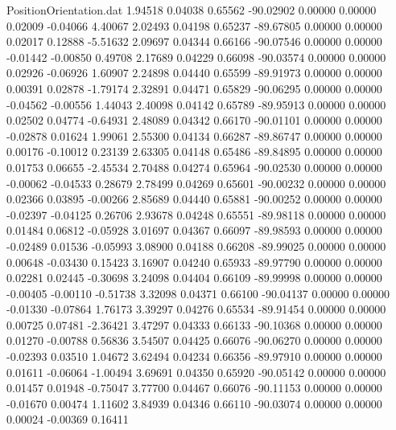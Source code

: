 \begin{filecontents}{PositionOrientation.dat}
   1.94518    0.04038    0.65562   -90.02902    0.00000    0.00000    0.02009   -0.04066    4.40067
   2.02493    0.04198    0.65237   -89.67805    0.00000    0.00000    0.02017    0.12888   -5.51632
   2.09697    0.04344    0.66166   -90.07546    0.00000    0.00000   -0.01442   -0.00850    0.49708
   2.17689    0.04229    0.66098   -90.03574    0.00000    0.00000    0.02926   -0.06926    1.60907
   2.24898    0.04440    0.65599   -89.91973    0.00000    0.00000    0.00391    0.02878   -1.79174
   2.32891    0.04471    0.65829   -90.06295    0.00000    0.00000   -0.04562   -0.00556    1.44043
   2.40098    0.04142    0.65789   -89.95913    0.00000    0.00000    0.02502    0.04774   -0.64931
   2.48089    0.04342    0.66170   -90.01101    0.00000    0.00000   -0.02878    0.01624    1.99061
   2.55300    0.04134    0.66287   -89.86747    0.00000    0.00000    0.00176   -0.10012    0.23139
   2.63305    0.04148    0.65486   -89.84895    0.00000    0.00000    0.01753    0.06655   -2.45534
   2.70488    0.04274    0.65964   -90.02530    0.00000    0.00000   -0.00062   -0.04533    0.28679
   2.78499    0.04269    0.65601   -90.00232    0.00000    0.00000    0.02366    0.03895   -0.00266
   2.85689    0.04440    0.65881   -90.00252    0.00000    0.00000   -0.02397   -0.04125    0.26706
   2.93678    0.04248    0.65551   -89.98118    0.00000    0.00000    0.01484    0.06812   -0.05928
   3.01697    0.04367    0.66097   -89.98593    0.00000    0.00000   -0.02489    0.01536   -0.05993
   3.08900    0.04188    0.66208   -89.99025    0.00000    0.00000    0.00648   -0.03430    0.15423
   3.16907    0.04240    0.65933   -89.97790    0.00000    0.00000    0.02281    0.02445   -0.30698
   3.24098    0.04404    0.66109   -89.99998    0.00000    0.00000   -0.00405   -0.00110   -0.51738
   3.32098    0.04371    0.66100   -90.04137    0.00000    0.00000   -0.01330   -0.07864    1.76173
   3.39297    0.04276    0.65534   -89.91454    0.00000    0.00000    0.00725    0.07481   -2.36421
   3.47297    0.04333    0.66133   -90.10368    0.00000    0.00000    0.01270   -0.00788    0.56836
   3.54507    0.04425    0.66076   -90.06270    0.00000    0.00000   -0.02393    0.03510    1.04672
   3.62494    0.04234    0.66356   -89.97910    0.00000    0.00000    0.01611   -0.06064   -1.00494
   3.69691    0.04350    0.65920   -90.05142    0.00000    0.00000    0.01457    0.01948   -0.75047
   3.77700    0.04467    0.66076   -90.11153    0.00000    0.00000   -0.01670    0.00474    1.11602
   3.84939    0.04346    0.66110   -90.03074    0.00000    0.00000    0.00024   -0.00369    0.16411

\end{filecontents}
